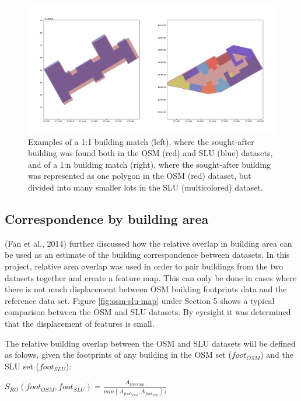 \documentclass[a4paper]{article}
\begin{document}
\begin{figure}[H]
    \centering
    \includegraphics[width=\textwidth,height=0.5\textheight,keepaspectratio]{img_building_match}
    \caption{Examples of a 1:1 building match (left), where the sought-after building was found both in the OSM (red) and SLU (blue) datasets, and of a 1:n building match (right), where the sought-after building was represented as one polygon in the OSM (red) dataset, but divided into many smaller lots in the SLU (multicolored) dataset.}
    \label{fig:building-match-types}
\end{figure}

\subsection{Correspondence by building area}

(Fan et al., 2014) further discussed how the relative overlap in building area can be used as an estimate of the building correspondence between datasets.
In this project, relative area overlap was used in order to pair buildings from the two datasets together and create a feature map.
This can only be done in cases where there is not much displacement between OSM building footprints data and the reference data set.
Figure \ref{fig:osm-slu-map} under Section 5 shows a typical comparison between the OSM and SLU datasets.
By eyesight it was determined that the displacement of features is small.

The relative building overlap between the OSM and SLU datasets will be defined as folows, given the footprints of any building in the OSM set ($foot_{OSM}$) and the SLU set ($foot_{SLU}$):
\begin{center}
    $S_{RO}(foot_{OSM}, foot_{SLU}) = \frac{A_{Overlap}}{min(A_{foot_{OSM}}, A_{foot_{SLU}}))}$
\end{center}
\end{document}
